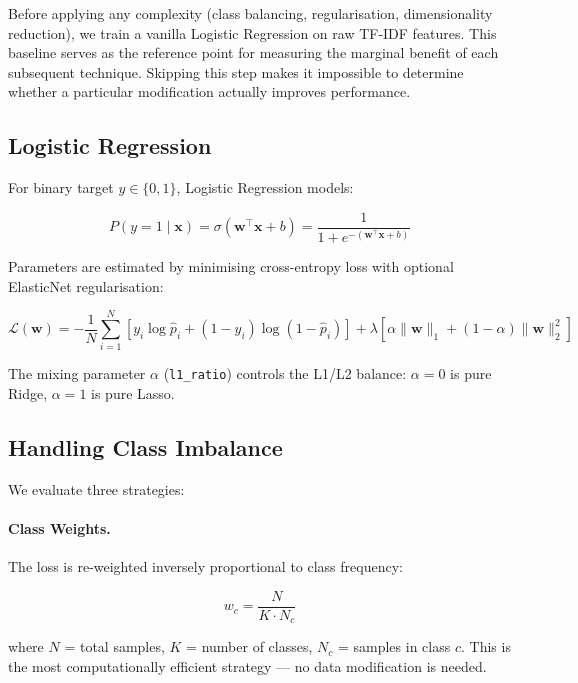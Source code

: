 \documentclass[11pt,a4paper]{article}
\begin{document}
Before applying any complexity (class balancing, regularisation,
dimensionality reduction), we train a vanilla Logistic Regression on
raw TF-IDF features.
This baseline serves as the reference point for measuring
the marginal benefit of each subsequent technique.
Skipping this step makes it impossible to determine whether a particular
modification actually improves performance.

\subsection{Logistic Regression}

For binary target $y \in \{0,1\}$, Logistic Regression models:

\begin{equation}
  P(y=1 \mid \mathbf{x}) = \sigma(\mathbf{w}^\top\mathbf{x} + b)
  = \frac{1}{1+e^{-(\mathbf{w}^\top\mathbf{x}+b)}}
\end{equation}

Parameters are estimated by minimising cross-entropy loss with optional
ElasticNet regularisation:

\begin{equation}
  \mathcal{L}(\mathbf{w}) = -\frac{1}{N}\sum_{i=1}^{N}
  \left[y_i\log\hat{p}_i + (1-y_i)\log(1-\hat{p}_i)\right]
  + \lambda\!\left[\alpha\|\mathbf{w}\|_1 + (1-\alpha)\|\mathbf{w}\|_2^2\right]
  \label{eq:en}
\end{equation}

The mixing parameter $\alpha$ (\texttt{l1\_ratio}) controls the
L1/L2 balance: $\alpha=0$ is pure Ridge, $\alpha=1$ is pure Lasso.

\subsection{Handling Class Imbalance}
\label{sec:imbalance}

We evaluate three strategies:

\paragraph{Class Weights.}
The loss is re-weighted inversely proportional to class frequency:

\begin{equation}
  w_c = \frac{N}{K \cdot N_c}
\end{equation}

where $N$ = total samples, $K$ = number of classes, $N_c$ = samples in
class $c$. This is the most computationally efficient strategy --- no data
modification is needed.
\end{document}

